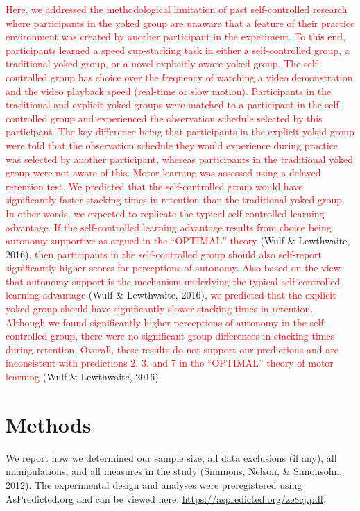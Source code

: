 \documentclass[
  english,
  man, donotrepeattitle,floatsintext]{apa7}
\begin{document}
\textcolor{red}{Here, we addressed the methodological limitation of past self-controlled research where participants in the yoked group are unaware that a feature of their practice environment was created by another participant in the experiment. To this end, participants learned a speed cup-stacking task in either a self-controlled group, a traditional yoked group, or a novel explicitly aware yoked group. The self-controlled group has choice over the frequency of watching a video demonstration and the video playback speed (real-time or slow motion). Participants in the traditional and explicit yoked groups were matched to a participant in the self-controlled group and experienced the observation schedule selected by this participant. The key difference being that participants in the explicit yoked group were told that the observation schedule they would experience during practice was selected by another participant, whereas participants in the traditional yoked group were not aware of this. Motor learning was assessed using a delayed retention test. We predicted that the self-controlled group would have significantly faster stacking times in retention than the traditional yoked group. In other words, we expected to replicate the typical self-controlled learning advantage. If the self-controlled learning advantage results from choice being autonomy-supportive as argued in the ``OPTIMAL'' theory} (Wulf \& Lewthwaite, 2016)\textcolor{red}{, then participants in the self-controlled group should also self-report significantly higher scores for perceptions of autonomy. Also based on the view that autonomy-support is the mechanism underlying the typical self-controlled learning advantage} (Wulf \& Lewthwaite, 2016)\textcolor{red}{, we predicted that the explicit yoked group should have significantly slower stacking times in retention. Although we found significantly higher perceptions of autonomy in the self-controlled group, there were no significant group differences in stacking times during retention. Overall, these results do not support our predictions and are inconsistent with predictions 2, 3, and 7 in the ``OPTIMAL'' theory of motor learning} (Wulf \& Lewthwaite, 2016).

\hypertarget{methods}{%
\section{Methods}\label{methods}}

We report how we determined our sample size, all data exclusions (if any), all manipulations, and all measures in the study (Simmons, Nelson, \& Simonsohn, 2012). The experimental design and analyses were preregistered using AsPredicted.org and can be viewed here: \url{https://aspredicted.org/ze8cj.pdf}.
\end{document}
